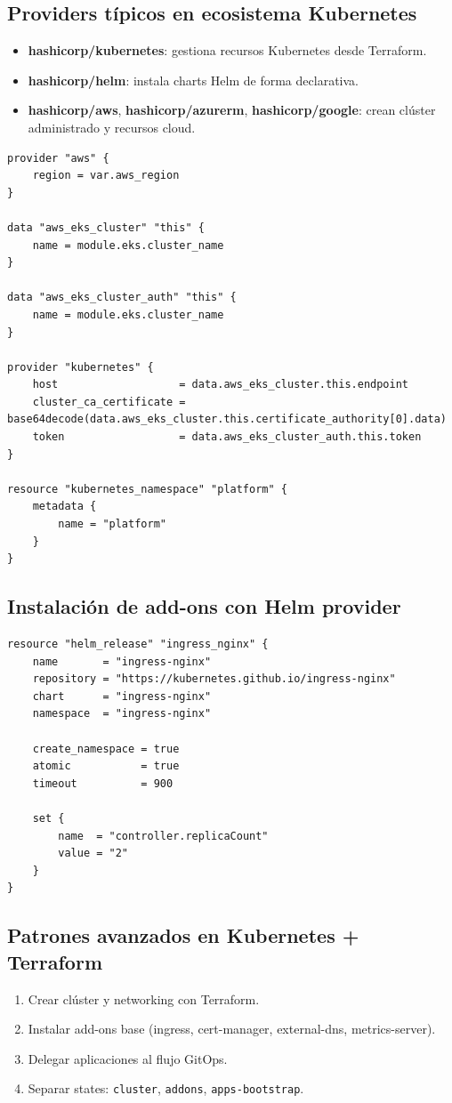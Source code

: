 \documentclass[12pt,a4paper]{article}
\begin{document}
\subsection{Providers típicos en ecosistema Kubernetes}
\begin{itemize}
		\item \textbf{hashicorp/kubernetes}: gestiona recursos Kubernetes desde Terraform.
		\item \textbf{hashicorp/helm}: instala charts Helm de forma declarativa.
		\item \textbf{hashicorp/aws}, \textbf{hashicorp/azurerm}, \textbf{hashicorp/google}: crean clúster administrado y recursos cloud.
\end{itemize}

\begin{lstlisting}[caption=Ejemplo mínimo: EKS + provider kubernetes]
provider "aws" {
	region = var.aws_region
}

data "aws_eks_cluster" "this" {
	name = module.eks.cluster_name
}

data "aws_eks_cluster_auth" "this" {
	name = module.eks.cluster_name
}

provider "kubernetes" {
	host                   = data.aws_eks_cluster.this.endpoint
	cluster_ca_certificate = base64decode(data.aws_eks_cluster.this.certificate_authority[0].data)
	token                  = data.aws_eks_cluster_auth.this.token
}

resource "kubernetes_namespace" "platform" {
	metadata {
		name = "platform"
	}
}
\end{lstlisting}

\subsection{Instalación de add-ons con Helm provider}
\begin{lstlisting}[caption=Ingress NGINX con Helm]
resource "helm_release" "ingress_nginx" {
	name       = "ingress-nginx"
	repository = "https://kubernetes.github.io/ingress-nginx"
	chart      = "ingress-nginx"
	namespace  = "ingress-nginx"

	create_namespace = true
	atomic           = true
	timeout          = 900

	set {
		name  = "controller.replicaCount"
		value = "2"
	}
}
\end{lstlisting}

\subsection{Patrones avanzados en Kubernetes + Terraform}
\begin{enumerate}
		\item Crear clúster y networking con Terraform.
		\item Instalar add-ons base (ingress, cert-manager, external-dns, metrics-server).
		\item Delegar aplicaciones al flujo GitOps.
		\item Separar states: \texttt{cluster}, \texttt{addons}, \texttt{apps-bootstrap}.
\end{enumerate}
\end{document}
